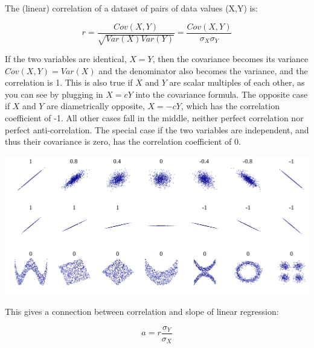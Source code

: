 \documentclass[
  letterpaper,
  DIV=11,
  numbers=noendperiod]{scrreprt}
\begin{document}
\begin{tcolorbox}[enhanced jigsaw, arc=.35mm, colframe=quarto-callout-note-color-frame, left=2mm, opacitybacktitle=0.6, breakable, title=\textcolor{quarto-callout-note-color}{\faInfo}\hspace{0.5em}{Definition}, toprule=.15mm, coltitle=black, bottomtitle=1mm, toptitle=1mm, colback=white, leftrule=.75mm, colbacktitle=quarto-callout-note-color!10!white, titlerule=0mm, opacityback=0, rightrule=.15mm, bottomrule=.15mm]

The  (linear) correlation of a dataset of pairs of
data values (X,Y) is:

\end{tcolorbox}

\[ r = \frac{Cov(X,Y)}{\sqrt{{Var(X)}{Var(Y)}}} =  \frac{Cov(X,Y)}{\sigma_X \sigma_Y}
\]

If the two variables are identical, \(X=Y\), then the covariance becomes
its variance \(Cov(X,Y) = Var(X)\) and the denominator also becomes the
variance, and the correlation is 1. This is also true if \(X\) and \(Y\)
are scalar multiples of each other, as you can see by plugging in
\(X= cY\) into the covariance formula. The opposite case if \(X\) and
\(Y\) are diametrically opposite, \(X = -cY\), which has the correlation
coefficient of -1. All other cases fall in the middle, neither perfect
correlation nor perfect anti-correlation. The special case if the two
variables are independent, and thus their covariance is zero, has the
correlation coefficient of 0.

\includegraphics{./ch8/Correlation_examples.png}
\label{fig:ch8_corr_examples}

This gives a connection between correlation and slope of linear
regression:

\begin{equation}
a = r \frac{\sigma_Y}{\sigma_X}
\label{eq:slope_corr}
\end{equation}
\end{document}
